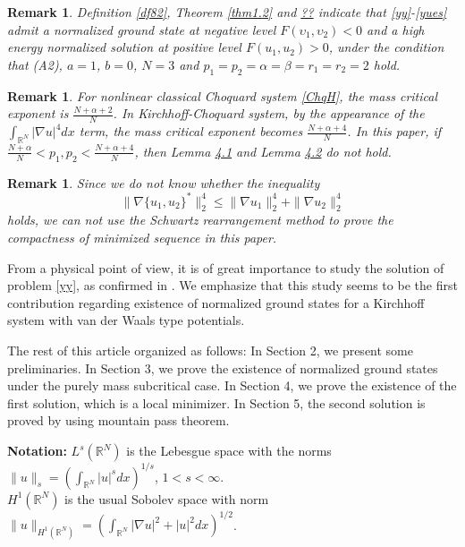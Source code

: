 \documentclass[10pt,a4paper]{amsart}
\numberwithin{equation}{section}
\newtheorem{remark}[theo]{Remark}
\begin{document}

 \begin{remark}  \label{rmk1.1} \rm
Definition \ref{df82}, Theorem \ref{thm1.2} and \href{https://ejde.math.txstate.edu/Volumes/2026/06/chen.pdf}{??}
indicate that \eqref{yy}-\eqref{yues} admit a normalized ground state at negative
level $F(\upsilon_1,\upsilon_2)<0$ and a high energy normalized solution at positive 
level $F(u_1,u_2)>0$, under the condition that
(A2), $a=1$, $b=0$, $N=3$ and $p_1=p_2=\alpha=\beta=r_1=r_2=2$ hold.
\end{remark}

\begin{remark} \label{rmk1.2} \rm
For nonlinear classical Choquard system \ref{ChqH}, the mass critical exponent is 
$\frac{N+\alpha+2}{N}$. In Kirchhoff-Choquard system,
by the appearance of the $\int_{\mathbb{R}^N}|\nabla u|^4dx$ term, the mass critical 
exponent becomes $\frac{N+\alpha+4}{N}$. In this
paper, if $\frac{N+\alpha}{N}<p_1,p_2<\frac{N+\alpha+4}{N}$, then Lemma 
\href{https://ejde.math.txstate.edu/Volumes/2026/06/chen.pdf}{4.1} and Lemma \href{https://ejde.math.txstate.edu/Volumes/2026/06/chen.pdf}{4.2} do not hold.
\end{remark}

\begin{remark} \label{rmk1.3} \rm
Since we do not know whether the inequality
 \[
\| \nabla \{u_1,u_2\}^*\|_2^4\leq\| \nabla u_1\|_2^4+\| \nabla u_2\|_2^4
 \]
holds, we can not use the Schwartz rearrangement method to prove the compactness
of minimized sequence in this paper.
\end{remark}


From a physical point of view, it is of great importance to study the solution of 
 problem  \eqref{yy}, as confirmed in  \cite{VWp3,BZd27,cfrv}.
 We emphasize that this study seems to be the first contribution regarding existence 
of normalized ground states for a Kirchhoff system with van der Waals type potentials.

The rest of this article organized as follows: 
In Section 2, we present some preliminaries. 
In Section 3, we prove the existence
 of normalized ground states under the purely mass subcritical case. 
In Section 4, we prove the existence of the
 first solution, which is a local minimizer. 
In Section 5, the second solution is proved by using mountain pass theorem.
\smallskip

\noindent\textbf{Notation:} 
 $L^s(\mathbb{R}^N)$ is the Lebesgue space with the norms 
 $\| u\| _s=(\int_{\mathbb{R}^N}|u|^sdx)^{1/s}$,  $1<s<\infty$.\\
$H^1(\mathbb{R}^N)$ is the usual Sobolev space with norm 
$\| u\|_{H^1(\mathbb{R}^N)}=
 (\int_{\mathbb{R}^N}|\nabla u|^2+|u|^2dx)^{1/2}$.
\end{document}
